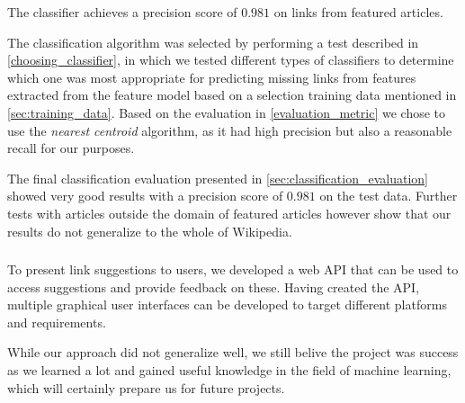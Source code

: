 The classifier achieves a precision score of $0.981$ on links from featured articles. 


The classification algorithm was selected by performing a test described in \cref{choosing_classifier}, in which we tested different types of classifiers to determine which one was most appropriate for predicting missing links from features extracted from the feature model based on a selection training data mentioned in \cref{sec:training_data}. Based on the evaluation in \cref{evaluation_metric} we chose to use the \emph{nearest centroid} algorithm, as it had high precision but also a reasonable recall for our purposes. 

The final classification evaluation presented in \cref{sec:classification_evaluation} showed very good results with a precision score of $0.981$ on the test data. Further tests with articles outside the domain of featured articles however show that our results do not generalize to the whole of Wikipedia. 


\subsubsection*{\subproblemthree}

To present link suggestions to users, we developed a web API that can be used to access suggestions and provide feedback on these. Having created the API, multiple graphical user interfaces can be developed to target different platforms and requirements.


While our approach did not generalize well, we still belive the project was success as we learned a lot and gained useful knowledge in the field of machine learning, which will certainly prepare us for future projects.

